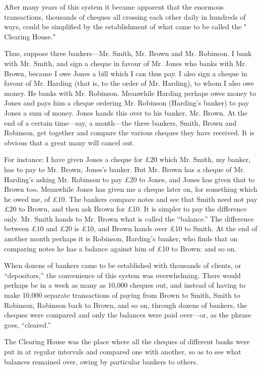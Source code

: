 \documentclass{book}
\begin{document}
After many years of this system it became apparent that the enormous transactions, thousands of cheques all crossing each other daily in hundreds of ways, could be simplified by the establishment of what came to be called the " Clearing House."

Thus, suppose three bankers—Mr. Smith, Mr. Brown and Mr. Robinson. I bank with Mr. Smith, and sign a cheque in favour of Mr. Jones who banks with Mr. Brown, because I owe Jones a bill which I can thus pay. I also sign a cheque in favour of Mr. Harding (that is, to the order of Mr. Harding), to whom I also owe money. He banks with Mr. Robinson. Meanwhile Harding perhaps owes money to Jones and pays him a cheque ordering Mr. Robinson (Harding’s banker) to pay Jones a sum of money. Jones hands this over to his banker, Mr. Brown. At the end of a certain time—say, a month—the three bankers, Smith, Brown and Robinson, get together and compare the various cheques they have received. It is obvious that a great many will cancel out.

For instance: I have given Jones a cheque for £20 which Mr. Smith, my banker, has to pay to Mr. Brown, Jones’s banker. But Mr. Brown has a cheque of Mr. Harding’s asking Mr. Robinson to pay £20 to Jones, and Jones has given that to Brown too. Meanwhile Jones has given me a cheque later on, for something which he owed me, of £10. The bankers compare notes and see that Smith need not pay £20 to Brown, and then ask Brown for £10. It is simpler to pay the difference only. Mr. Smith hands to Mr. Brown what is called the “balance.” The difference between £10 and £20 is £10, and Brown hands over £10 to Smith. At the end of another month perhaps it is Robinson, Harding’s banker, who finds that on comparing notes he has a balance against him of £10 to Brown: and so on.

When dozens of bankers came to be established with thousands of clients, or “depositors,” the convenience of this system was overwhelming. There would perhaps be in a week as many as 10,000 cheques out, and instead of having to make 10,000 separate transactions of paying from Brown to Smith, Smith to Robinson, Robinson back to Brown, and so on, through dozens of bankers, the cheques were compared and only the balances were paid over—or, as the phrase goes, “cleared.”

The Clearing House was the place where all the cheques of different banks were put in at regular intervals and compared one with another, so as to see what balances remained over, owing by particular bankers to others.
\end{document}
